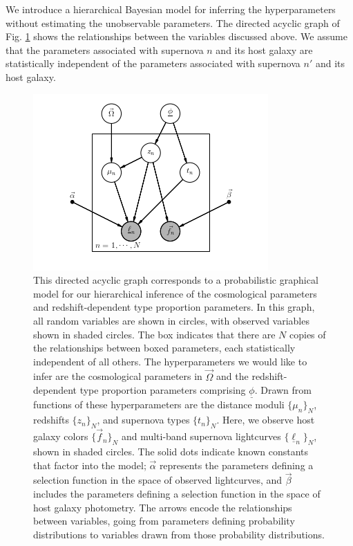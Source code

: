 \documentclass[12pt, onecolumn]{emulateapj}
\newcommand{\textul}{\underline}
\begin{document}
We introduce a hierarchical Bayesian model for inferring the hyperparameters without estimating the unobservable parameters.  The directed acyclic graph of Fig. \ref{fig:pgm} shows the relationships between the variables discussed above.  We assume that the parameters associated with supernova $n$ and its host galaxy are statistically independent of the parameters associated with supernova $n'$ and its host galaxy.

\vspace{1in}
\begin{figure}
\begin{center}
\includegraphics{fig/pgm.png}
\caption{This directed acyclic graph corresponds to a probabilistic graphical model for our hierarchical inference of the cosmological parameters and redshift-dependent type proportion parameters.  In this graph, all random variables are shown in circles, with observed variables shown in shaded circles.  The box indicates that there are $N$ copies of the relationships between boxed parameters, each statistically independent of all others.  The hyperparameters we would like to infer are the cosmological parameters in $\vec{\Omega}$ and the redshift-dependent type proportion parameters comprising $\textul{\phi}$.  Drawn from functions of these hyperparameters are the distance moduli $\{\mu_{n}\}_{N}$, redshifts $\{z_{n}\}_{N}$, and supernova types $\{t_{n}\}_{N}$.  Here, we observe host galaxy colors $\{\vec{f}_{n}\}_{N}$ and multi-band supernova lightcurves $\{\textul{\ell}_{n}\}_{N}$, shown in shaded circles.  The solid dots indicate known constants that factor into the model; $\vec{\alpha}$ represents the parameters defining a selection function in the space of observed lightcurves, and $\vec{\beta}$ includes the parameters defining a selection function in the space of host galaxy photometry.  The arrows encode the relationships between variables, going from parameters defining probability distributions to variables drawn from those probability distributions.}
\label{fig:pgm}
\end{center}
\end{figure}
\vspace{1in}
\end{document}
